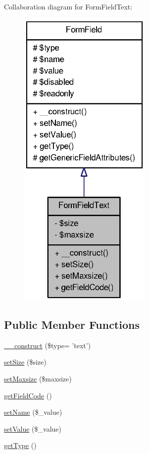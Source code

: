 Collaboration diagram for FormFieldText:\nopagebreak
\begin{figure}[H]
\begin{center}
\leavevmode
\includegraphics[width=184pt]{classFormFieldText__coll__graph}
\end{center}
\end{figure}
\subsection*{Public Member Functions}
\begin{DoxyCompactItemize}
\item 
\hyperlink{classFormFieldText_a19f605d6195d340c6ddf9a298706b9cd}{\_\-\_\-construct} (\$type= 'text')
\item 
\hyperlink{classFormFieldText_a045b0853ed6e7777c7f3dddbadf31f5f}{setSize} (\$size)
\item 
\hyperlink{classFormFieldText_a91b6ce8a3476c4296fbe1b0802e70984}{setMaxsize} (\$maxsize)
\item 
\hyperlink{classFormFieldText_aebbf56aba1fd099619a360ac259633fa}{getFieldCode} ()
\item 
\hyperlink{classFormField_ad57e32bd53170af060e869b3b60f0ef7}{setName} (\$\_\-value)
\item 
\hyperlink{classFormField_a465ff61e290d82be96bb793c3a14b3e7}{setValue} (\$\_\-value)
\item 
\hyperlink{classFormField_a1f64b737bccb6b2827f8c5665b9920c7}{getType} ()
\end{DoxyCompactItemize}
